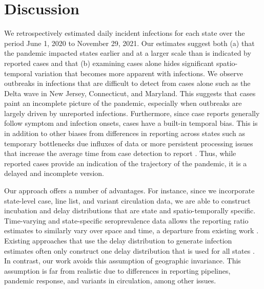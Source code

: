 \section{Discussion}

We retrospectively estimated daily incident infections for each \US state over
the period June 1, 2020 to November 29, 2021. Our estimates suggest both (a)
that the pandemic impacted states earlier and at a larger scale than is
indicated by reported cases and that (b) examining cases alone hides significant
spatio-temporal variation that becomes more apparent with infections. We observe
outbreaks in infections that are difficult to detect from cases alone such as
the Delta wave in New Jersey, Connecticut, and Maryland. This suggests that
cases paint an incomplete picture of the pandemic, especially when outbreaks are
largely driven by unreported infections. Furthermore, since case reports
generally follow symptom and infection onsets, cases have a built-in temporal
bias. This is in addition to other biases from differences in reporting across
states such as temporary bottlenecks due influxes of data or more persistent
processing issues that increase the average time from case detection to report
\citep{wash2020dash, dunkel2020covid19}. Thus, while reported cases provide an
indication of the trajectory of the pandemic, it is a delayed and incomplete
version.

Our approach offers a number of advantages. For instance, since we incorporate 
state-level case, line list, and variant circulation data, we are able to construct 
incubation and delay distributions that are state and spatio-temporally specific.
Time-varying and state-specific seroprevalence data allows the reporting ratio
estimates to similarly vary over space and time, a departure from existing work
\citep{unwin2020state, uga2020covid19}. Existing approaches that use the delay
distribution to generate infection estimates often only construct one delay
distribution that is used for all states \citep{chitwood2022reconstructing,
jahja2022real}. In contrast, our work avoids this assumption of geographic
invariance. This assumption is far from realistic due to
differences in reporting pipelines, pandemic response, and variants in
circulation, among other issues. 

